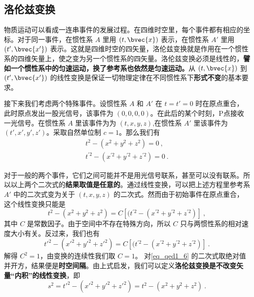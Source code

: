 

\subsection{洛伦兹变换}
物质运动可以看成一连串事件的发展过程。在四维时空里，每个事件都有相应的坐标。对于同一事件，在惯性系 $A$ 里用 $(t, \bvec{x})$ 表示，在惯性系 $A'$ 里用 $(t', \bvec{x'})$ 表示。这就是四维时空的四矢量，洛伦兹变换就是作用在一个惯性系的四维矢量上，使之变为另一个惯性系的四矢量。洛伦兹变换必须是线性的，\textbf{譬如一个惯性系中的匀速运动，换了参考系也依然是匀速运动。}从 $(t, \bvec{x})$ 到 $(t', \bvec{x'})$ 的线性变换是保证一切物理定律在不同惯性系下\textbf{形式不变}的基本要求。

接下来我们考虑两个特殊事件。设惯性系 $A$ 和 $A'$ 在 $t=t'=0$ 时在原点重合，此时原点发出一股光信号，该事件为 $(0,0,0,0)$。在此后的某个时刻，P点接收一光信号。在惯性系 $A$ 里该事件为为 $(t,x,y,z)$,在惯性系 $A'$ 里该事件为 $(t',x',y',z')$。采取自然单位制 $c=1$。那么我们有
\begin{equation}\label{eq_qed1_6}
\begin{array}{c}
t^{2}-(x^{2}+y^{2}+z^{2})=0~,\\
t^{\prime 2}-(x^{\prime 2}+y^{\prime 2}+z^{\prime 2})=0~.
\end{array}
\end{equation}

对于一般的两个事件，它们之间可能并不是用光信号联系，甚至可以没有联系。所以以上两个二次式的\textbf{结果取值是任意的}。通过线性变换，可以把上述方程里参考系 $A'$ 中的二次式变为关于 $(t,x,y,z)$ 的二次式。然而由于初始事件在原点重合，这个线性变换只能是
\begin{equation}
t^{2}-(x^{2}+y^{2}+z^{2})=C\left[(t^{\prime 2}-(x^{\prime 2}+y^{\prime 2}+z^{\prime 2})\right]~,
\end{equation}
其中 $C$ 是常数因子。由于空间中不存在特殊方向，所以 $C$ 只与两惯性系的相对速度大小有关。反过来，我们也有
\begin{equation}
t'^{2}-(x'^{2}+y'^{2}+z'^{2})=C\left[(t^{\prime 2}-(x^{\prime 2}+y^{\prime 2}+z^{\prime 2})\right]~.
\end{equation}
解得 $C^2=1$，由变换的连续性我们取 $C=1$。
对\autoref{eq_qed1_6} 的二次式取绝对值并开方，结果便是\textbf{时空间隔}。由上式启发，我们可以定义\textbf{洛伦兹变换是不改变矢量“内积”的线性变换}，即
\begin{equation}\label{eq_qed1_7}
s^2=t'^{2}-(x'^{2}+y'^{2}+z'^{2})=t^{2}-(x^{2}+y^{2}+z^{2})~.
\end{equation}

